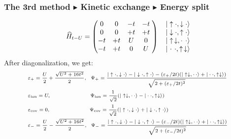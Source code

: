 \documentclass{beamer}
\begin{document}
  \begin{frame}
    \frametitle{The 3rd method \(\blacktriangleright\) Kinetic exchange \(\blacktriangleright\) Energy split}
    \begin{equation*}
      \widehat{H}_{t-U} = \begin{pmatrix}
        0 &  0 & -t & -t \;\\
        0 &  0 & +t & +t \;\\
       -t & +t &  U &  0 \;\\
       -t & +t &  0 &  U \;
      \end{pmatrix}\ \ \ \begin{matrix}
        |\uparrow\cdot,\downarrow\cdot\rangle\\
        |\downarrow\cdot,\uparrow\cdot\rangle\\
        |\uparrow\hspace{0.15em}\downarrow,\cdot\hspace{0.4em}\cdot\rangle\\
        |\hspace{0.1em}\cdot\hspace{0.15em}\cdot,\uparrow\hspace{0.15em}\downarrow\rangle
      \end{matrix}
    \end{equation*}
    After diagonalization, we get:
    \begin{subequations}\scriptsize
      \begin{align}
        &\varepsilon_+ = \dfrac{U}{2} + \dfrac{\sqrt{U^2+16t^2}}{2},\ \  \Psi_+ = \dfrac{|\uparrow\cdot,\downarrow\cdot\rangle - |\downarrow\cdot,\uparrow\cdot\rangle - (\varepsilon_+/2t)(|\uparrow\downarrow,\cdot\hspace{0.2em}\cdot\rangle + |\cdot\cdot,\uparrow\downarrow\rangle)}{\sqrt{2+(\varepsilon_+/2t)^2}}\\
        &\varepsilon_{\text{ion}} = U,\hspace{7.2em} \Psi_{\text{ion}} = \dfrac{1}{\sqrt{2}}(|\uparrow\downarrow,\cdot\hspace{0.2em}\cdot\rangle - |\cdot\cdot,\uparrow\downarrow\rangle)\\
        &\varepsilon_{\text{cov}} = 0,\hspace{7.15em}  \Psi_{\text{cov}} = \dfrac{1}{\sqrt{2}}(|\uparrow\cdot,\downarrow\cdot\rangle + |\downarrow\cdot,\uparrow\cdot\rangle)\\
        &\varepsilon_- = \dfrac{U}{2} - \dfrac{\sqrt{U^2+16t^2}}{2},\ \  \Psi_- = \dfrac{|\uparrow\cdot,\downarrow\cdot\rangle - |\downarrow\cdot,\uparrow\cdot\rangle - (\varepsilon_-/2t)(|\uparrow\downarrow,\cdot\hspace{0.2em}\cdot\rangle + |\cdot\cdot,\uparrow\downarrow\rangle)}{\sqrt{2+(\varepsilon_-/2t)^2}}
      \end{align}
    \end{subequations}
  \end{frame}
\end{document}
